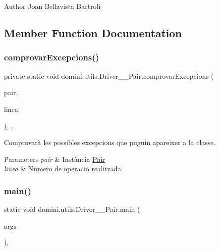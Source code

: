 \begin{DoxyAuthor}{Author}
Joan Bellavista Bartroli 
\end{DoxyAuthor}


\subsection{Member Function Documentation}
\mbox{\label{classdomini_1_1utils_1_1Driver____Pair_a640e07e7811e0b56a99ca1afb7e16b65}} 
\subsubsection{\texorpdfstring{comprovar\+Excepcions()}{comprovarExcepcions()}}
{\footnotesize\ttfamily private static void domini.\+utils.\+Driver\+\_\+\+\_\+\+Pair.\+comprovar\+Excepcions (\begin{DoxyParamCaption}\item[{\hyperlink{classdomini_1_1utils_1_1Pair}{Pair}$<$ Byte, Byte $>$}]{pair,  }\item[{String}]{linea }\end{DoxyParamCaption})\hspace{0.3cm}{\ttfamily [inline]}, {\ttfamily [static]}, {\ttfamily [private]}}



Comprovarà les possibles excepcions que puguin apareixer a la classe. 


\begin{DoxyParams}{Parameters}
{\em pair} & Instància \hyperlink{classdomini_1_1utils_1_1Pair}{Pair} \\
\hline
{\em linea} & Número de operació realitzada \\
\hline
\end{DoxyParams}
\mbox{\label{classdomini_1_1utils_1_1Driver____Pair_a6f6dda90b506c692dd03c4fc174550b7}} 
\subsubsection{\texorpdfstring{main()}{main()}}
{\footnotesize\ttfamily static void domini.\+utils.\+Driver\+\_\+\+\_\+\+Pair.\+main (\begin{DoxyParamCaption}\item[{String \mbox{[}$\,$\mbox{]}}]{args }\end{DoxyParamCaption})\hspace{0.3cm}{\ttfamily [inline]}, {\ttfamily [static]}}


